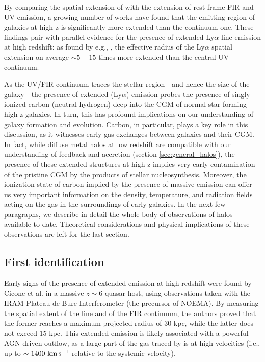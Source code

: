 By comparing the spatial extension of \CII with the extension of rest-frame FIR and UV emission, a growing number of works \citep{carniani2018b, Fujimoto19, ginolfi:2019, Fujimoto:2020qzo, herrera2021kiloparsec} have found that the \CII emitting region of galaxies at high-z is significantly more extended than the continuum one. These findings pair with parallel evidence for the presence of extended Ly$\alpha$ line emission at high redshift: as found by e.g., \citet{Wisotzki16}, the effective radius of the Ly$\alpha$ spatial extension on average $\sim 5-15$ times more extended than the central UV continuum. 

As the UV/FIR continuum traces the stellar region - and hence the size of the galaxy - the presence of extended \CII (Ly$\alpha$) emission probes the presence of singly ionized carbon (neutral hydrogen) deep into the CGM of normal star-forming high-z galaxies. In turn, this has profound implications on our understanding of galaxy formation and evolution. Carbon, in particular, plays a key role in this discussion, as it witnesses early gas exchanges between galaxies and their CGM. In fact, while diffuse metal halos at low redshift are compatible with our understanding of feedback and accretion (section \ref{sec:general_halos}), the presence of these extended structures at high-z implies very early contamination of the pristine CGM by the products of stellar nucleosynthesis. Moreover, the ionization state of carbon implied by the presence of massive \CII emission can offer us very important information on the density, temperature, and radiation fields acting on the gas in the surroundings of early galaxies. In the next few paragraphs, we describe in detail the whole body of observations of \CII halos available to date. Theoretical considerations and physical implications of these observations are left for the last section.  






\subsection{First identification}

Early signs of the presence of \CII extended emission at high redshift were found by Cicone et al. \citep{cicone2015} in a massive $z\sim6$ quasar host, using observations taken with the IRAM Plateau de Bure Interferometer (the precursor of NOEMA). By measuring the spatial extent of the \CII line and of the FIR continuum, the authors proved that the former reaches a maximum projected radius of $30$ kpc, while the latter does not exceed $15$ kpc. This extended emission is likely associated with a powerful AGN-driven outflow, as a large part of the gas traced by \CII is at high velocities (i.e., up to $\sim 1400\,\,\rm km\,s^{-1}$ relative to the systemic velocity). 


